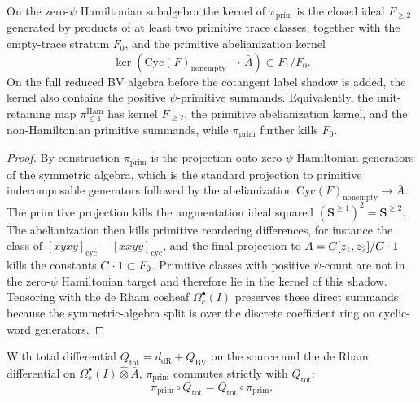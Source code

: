\begin{lem}\label{lem:primitive-shadow-kernel}
  On the zero-\(\psi\) Hamiltonian subalgebra the kernel of
  $\pi_{\mathrm{prim}}$ is the closed ideal $F_{\geq 2}$ generated by
  products of at least two primitive trace classes, together with the
  empty-trace stratum \(F_0\), and the primitive abelianization kernel
  \[
    \ker\!\left(\mathrm{Cyc}(F)_{\mathrm{nonempty}}\to\bar A\right)
    \subset F_1/F_0 .
  \]
  On the full reduced BV algebra before the cotangent label shadow is
  added, the kernel also contains the positive \(\psi\)-primitive
  summands.  Equivalently, the unit-retaining map
  \(\pi_{\leq1}^{\mathrm{Ham}}\) has kernel \(F_{\ge2}\), the primitive
  abelianization kernel, and the non-Hamiltonian primitive summands, while
  \(\pi_{\mathrm{prim}}\) further kills \(F_0\).
\end{lem}

\begin{proof}
  By construction $\pi_{\mathrm{prim}}$ is the projection onto
  zero-\(\psi\) Hamiltonian generators of the symmetric algebra, which is
  the standard projection to primitive indecomposable generators followed
  by the abelianization
  \(\mathrm{Cyc}(F)_{\mathrm{nonempty}}\to\bar A\).  The primitive
  projection kills the augmentation ideal squared
  \((\mathbf S^{\geq1})^2=\mathbf S^{\geq2}\).  The abelianization then
  kills primitive reordering differences, for instance the class of
  \([xyxy]_{\mathrm{cyc}}-[xxyy]_{\mathrm{cyc}}\), and the final
  projection to \(A=C[z_1,z_2]/C\cdot1\) kills the constants
  \(C\cdot1\subset F_0\).  Primitive classes with positive
  \(\psi\)-count are not in the zero-\(\psi\) Hamiltonian target and
  therefore lie in the kernel of this shadow.  Tensoring with the de Rham
  cosheaf \(\Omega^\bullet_c(I)\) preserves these direct summands because
  the symmetric-algebra split is over the discrete coefficient ring on
  cyclic-word generators.
\end{proof}

\begin{thm}\label{thm:chain-level-primitive-projection-Q}
  With total differential
  \(Q_{\mathrm{tot}}=d_{\mathrm{dR}}+Q_{\mathrm{BV}}\) on the source and
  the de Rham differential on
  \(\Omega^\bullet_c(I)\widehat\otimes\bar A\),
  $\pi_{\mathrm{prim}}$ commutes strictly with $Q_{\mathrm{tot}}$:
  $$\pi_{\mathrm{prim}}\circ Q_{\mathrm{tot}}
    =Q_{\mathrm{tot}}\circ\pi_{\mathrm{prim}}.$$
\end{thm}

